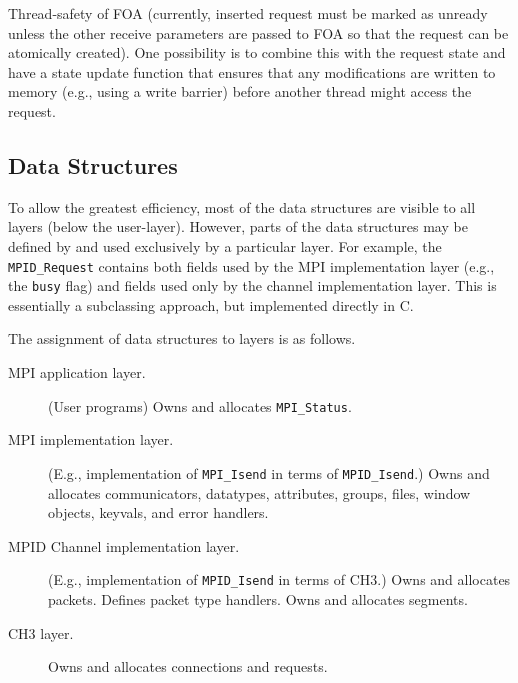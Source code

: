 \documentclass{article}
\def\code{\begingroup\makeustext\eatcode}
\def\eatcode#1{\texttt{#1}\endgroup}
\begin{document}

Thread-safety of FOA (currently, inserted request must be marked as unready
unless the other receive parameters are passed to FOA so that the request can
be atomically created).  One possibility is to combine this with the request
state and have a state update function that ensures that any modifications are
written to memory (e.g., using a write barrier) before another thread might
access the request.

\subsection{Data Structures}
To allow the greatest efficiency, most of the data structures are
visible to all layers (below the user-layer).  However, parts of the
data structures may be defined by and used exclusively by a particular
layer.  For example, the \code{MPID_Request} contains both fields used
by the MPI implementation layer (e.g., the \code{busy} flag) and
fields used only by the channel implementation layer.  This is
essentially a subclassing approach, but implemented directly in C.

The assignment of data structures to layers is as follows.
\begin{description}
\item[MPI application layer.](User programs) Owns and allocates
  \code{MPI_Status}. 
\item[MPI implementation layer.](E.g., implementation of \code{MPI_Isend} in
  terms of \code{MPID_Isend}.) Owns and allocates communicators, datatypes,
  attributes, groups, files, window objects, keyvals, and error handlers.
\item[MPID Channel implementation layer.](E.g., implementation of
  \code{MPID_Isend} in terms of CH3.) Owns and allocates packets.
  Defines packet type handlers.  Owns and allocates segments.
\item[CH3 layer.] Owns and allocates connections and requests.
\end{description}



\end{document}
